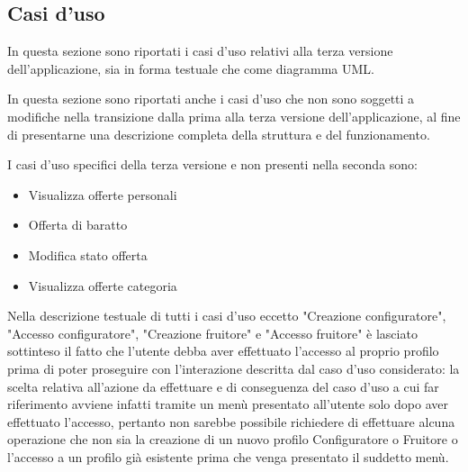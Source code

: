 \subsection{Casi d'uso}
In questa sezione sono riportati i casi d'uso relativi alla terza versione dell'applicazione, sia in forma testuale che come diagramma UML.\bigskip 

In questa sezione sono riportati anche i casi d'uso che non sono soggetti a modifiche nella transizione dalla prima alla terza versione dell'applicazione, al fine di presentarne una descrizione completa della struttura e del funzionamento.\bigskip

I casi d'uso specifici della terza versione e non presenti nella seconda sono:
\begin{itemize}
    \item Visualizza offerte personali
    \item Offerta di baratto
    \item Modifica stato offerta
    \item Visualizza offerte categoria
\end{itemize} \bigskip

Nella descrizione testuale di tutti i casi d'uso eccetto "Creazione configuratore", "Accesso configuratore", "Creazione fruitore" e "Accesso fruitore" è lasciato sottinteso il fatto che l'utente debba aver effettuato l'accesso al proprio profilo prima di poter proseguire con l'interazione descritta dal caso d'uso considerato: la scelta relativa all'azione da effettuare e di conseguenza del caso d'uso a cui far riferimento avviene infatti tramite un menù presentato all'utente solo dopo aver effettuato l'accesso, pertanto non sarebbe possibile richiedere di effettuare alcuna operazione che non sia la creazione di un nuovo profilo Configuratore o Fruitore o l'accesso a un profilo già esistente prima che venga presentato il suddetto menù.\bigskip



